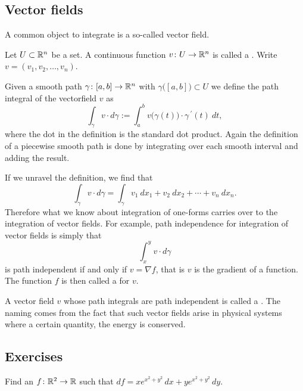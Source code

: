 \subsection{Vector fields}

A common object to integrate is a so-called vector field.

\begin{defn}
Let $U \subset {\mathbb{R}}^n$ be a set.
A continuous function $v \colon U \to {\mathbb{R}}^n$ is called a
\emph{}.  Write $v = (v_1,v_2,\ldots,v_n)$.

Given a smooth path $\gamma \colon [a,b] \to {\mathbb{R}}^n$ with
$\gamma\bigl([a,b]\bigr) \subset U$ we define
the path integral of the vectorfield $v$ as
\begin{equation*}
\int_{\gamma} v \cdot d\gamma
:=
\int_a^b v\bigl(\gamma(t)\bigr) \cdot \gamma^{\:\prime}(t) ~ dt ,
\end{equation*}
where the dot in the definition is the standard dot product.
Again the definition of a piecewise smooth path is done by integrating over
each smooth interval and adding the result.
\end{defn}

If we unravel the definition, we find that
\begin{equation*}
\int_{\gamma} v \cdot d\gamma
=
\int_{\gamma} v_1 ~dx_1 + v_2 ~dx_2 + \cdots + v_n ~dx_n .
\end{equation*}
Therefore what we know about integration of
one-forms carries over to the integration of vector fields.
For example, path independence for integration of vector fields is simply
that
\begin{equation*}
\int_x^y v \cdot d\gamma
\end{equation*}
is path independent if and only if 
$v = \nabla f$, that is $v$ is the gradient of a function.  The function $f$
is then called a \emph{} for $v$.

A vector field $v$ whose path integrals are path independent is called
a \emph{}.  The naming comes from the
fact that such vector fields arise in physical systems
where a certain quantity, the energy is conserved.

\subsection{Exercises}

\begin{exercise}
Find an $f \colon {\mathbb{R}}^2 \to {\mathbb{R}}$ such that $df = xe^{x^2+y^2}\, dx +
ye^{x^2+y^2} \, dy$.
\end{exercise}

